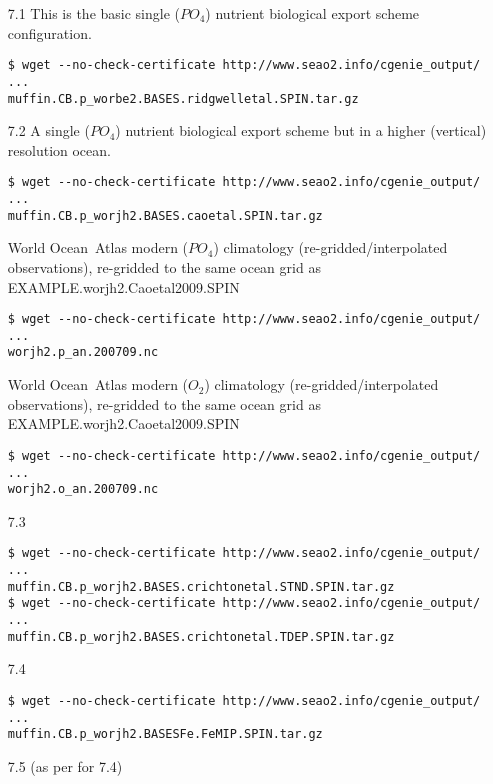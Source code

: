 \begin{itemize}[noitemsep]
\vspace{2mm}
\item [7.1] This is the basic single (\(PO_{4}\)) nutrient biological export scheme configuration.
\vspace{-1mm}\small\begin{verbatim}
$ wget --no-check-certificate http://www.seao2.info/cgenie_output/ ...
muffin.CB.p_worbe2.BASES.ridgwelletal.SPIN.tar.gz
\end{verbatim}\normalsize\vspace{-1mm}
\vspace{2mm}
\item [7.2] A single (\(PO_{4}\)) nutrient biological export scheme but in a higher (vertical) resolution ocean.
\vspace{-1mm}\small\begin{verbatim}
$ wget --no-check-certificate http://www.seao2.info/cgenie_output/ ...
muffin.CB.p_worjh2.BASES.caoetal.SPIN.tar.gz
\end{verbatim}\normalsize\vspace{-1mm}
World Ocean\ Atlas modern (\(PO_{4}\)) climatology (re-gridded/interpolated observations), re-gridded to the same ocean grid as \textsf{\footnotesize EXAMPLE.worjh2.Caoetal2009.SPIN}
\vspace{-1mm}\small\begin{verbatim}
$ wget --no-check-certificate http://www.seao2.info/cgenie_output/ ...
worjh2.p_an.200709.nc
\end{verbatim}\normalsize\vspace{-1mm}
World Ocean\ Atlas modern (\(O_{2}\)) climatology (re-gridded/interpolated observations), re-gridded to the same ocean grid as \textsf{\footnotesize EXAMPLE.worjh2.Caoetal2009.SPIN}
\vspace{-1mm}\small\begin{verbatim}
$ wget --no-check-certificate http://www.seao2.info/cgenie_output/ ...
worjh2.o_an.200709.nc
\end{verbatim}\normalsize\vspace{-1mm}
\vspace{2mm}
\item [7.3] 
\small \begin{verbatim}
$ wget --no-check-certificate http://www.seao2.info/cgenie_output/ ...
muffin.CB.p_worjh2.BASES.crichtonetal.STND.SPIN.tar.gz
$ wget --no-check-certificate http://www.seao2.info/cgenie_output/ ...
muffin.CB.p_worjh2.BASES.crichtonetal.TDEP.SPIN.tar.gz
\end{verbatim} \normalsize
\vspace{2mm}
\item [7.4] 
\small\begin{verbatim}
$ wget --no-check-certificate http://www.seao2.info/cgenie_output/ ...
muffin.CB.p_worjh2.BASESFe.FeMIP.SPIN.tar.gz
\end{verbatim}\normalsize
\vspace{2mm}
\item [7.5] 
(as per for 7.4)
\end{itemize}


